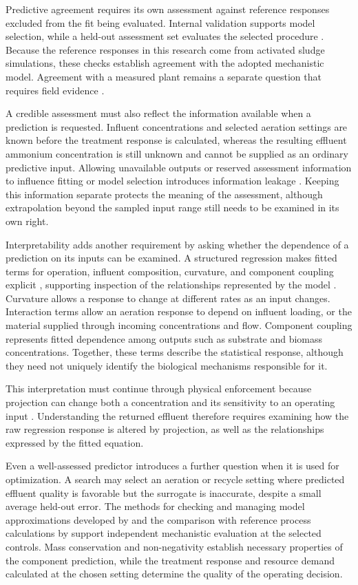 Predictive agreement requires its own assessment against reference responses excluded from the fit being evaluated. Internal validation supports model selection, while a held-out assessment set evaluates the selected procedure \citep{Hastie2009,Kaufman2012}. Because the reference responses in this research come from activated sludge simulations, these checks establish agreement with the adopted mechanistic model. Agreement with a measured plant remains a separate question that requires field evidence \citep{Machado2014,Newhart2019}.

A credible assessment must also reflect the information available when a prediction is requested. Influent concentrations and selected aeration settings are known before the treatment response is calculated, whereas the resulting effluent ammonium concentration is still unknown and cannot be supplied as an ordinary predictive input. Allowing unavailable outputs or reserved assessment information to influence fitting or model selection introduces information leakage \citep{Kaufman2012,Newhart2019}. Keeping this information separate protects the meaning of the assessment, although extrapolation beyond the sampled input range still needs to be examined in its own right.

Interpretability adds another requirement by asking whether the dependence of a prediction on its inputs can be examined. A structured regression makes fitted terms for operation, influent composition, curvature, and component coupling explicit \citep{Selerio2026}, supporting inspection of the relationships represented by the model \citep{Rudin2019,Brunton2016}. Curvature allows a response to change at different rates as an input changes. Interaction terms allow an aeration response to depend on influent loading, or the material supplied through incoming concentrations and flow. Component coupling represents fitted dependence among outputs such as substrate and biomass concentrations. Together, these terms describe the statistical response, although they need not uniquely identify the biological mechanisms responsible for it.

This interpretation must continue through physical enforcement because projection can change both a concentration and its sensitivity to an operating input \citep{Selerio2026}. Understanding the returned effluent therefore requires examining how the raw regression response is altered by projection, as well as the relationships expressed by the fitted equation.

Even a well-assessed predictor introduces a further question when it is used for optimization. A search may select an aeration or recycle setting where predicted effluent quality is favorable but the surrogate is inaccurate, despite a small average held-out error. The methods for checking and managing model approximations developed by \citet{Alexandrov1998} and the comparison with reference process calculations by \citet{Pedrozo2025} support independent mechanistic evaluation at the selected controls. Mass conservation and non-negativity establish necessary properties of the component prediction, while the treatment response and resource demand calculated at the chosen setting determine the quality of the operating decision.

